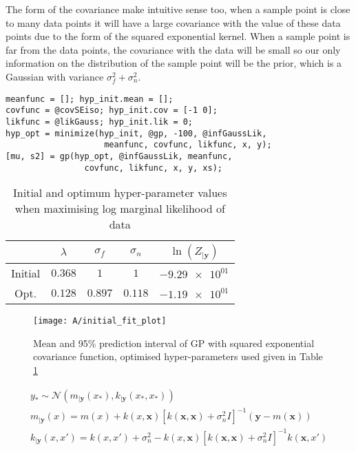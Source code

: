 \documentclass[11pt, twocolumn]{article}
\begin{document}
The form of the covariance make intuitive sense too, when a sample point is close to many data points it will have a large covariance with the value of these data points due to the form of the squared exponential kernel. When a sample point is far from the data points, the covariance with the data will be small so our only information on the distribution of the sample point will be the prior, which is a Gaussian with variance $\sigma_f^2 + \sigma_n^2$.

\begin{figure*}[h]
\begin{lstlisting}[caption=Code to train hyper-parameters and generate the predictive distribution of a GP with squared exponential covariance, captionpos=b, basicstyle=\small, frame=tlrb]
meanfunc = []; hyp_init.mean = [];
covfunc = @covSEiso; hyp_init.cov = [-1 0];
likfunc = @likGauss; hyp_init.lik = 0;
hyp_opt = minimize(hyp_init, @gp, -100, @infGaussLik, 
                    meanfunc, covfunc, likfunc, x, y);
[mu, s2] = gp(hyp_opt, @infGaussLik, meanfunc, 
                covfunc, likfunc, x, y, xs);
\end{lstlisting}
\end{figure*}
\label{lst:A}

\begin{table}[h]
    \centering
    \small
    \begin{tabular}{|c|c|c|c|c|}
        \hline
         & $\lambda$ & $\sigma_f$ & $\sigma_n$ & $\ln(Z_{|\textbf{y}})$ \\
        \hline
        Initial & $0.368$ & $1$ & $1$ & $\num{-9.29e+01}$ \\ 
        Opt. & $0.128$ & $0.897$ & $0.118$ & $\num{-1.19e+01}$ \\ 
        \hline
    \end{tabular}
    \caption{Initial and optimum hyper-parameter values when maximising log marginal likelihood of data}
    \label{table:A_hyper_parameters}
\end{table}

\begin{figure}[h]
    \centering
    \texttt{[image: A/initial\_fit\_plot]}
    \caption{Mean and 95\% prediction interval of GP with squared exponential covariance function, optimised hyper-parameters used given in Table \ref{table:A_hyper_parameters}}
    \label{fig:A}
\end{figure}

\begin{equation*}
    \begin{gathered}
        y_* \sim \mathcal{N}(m_{|\textbf{y}}(x_*), k_{|\textbf{y}}(x_*, x_*)) \\
        m_{|\textbf{y}}(x) = m(x) + k(x, \textbf{x})[k(\textbf{x}, \textbf{x}) + \sigma_n^2 I]^{-1} (\textbf{y} - m(\textbf{x})) \\
        k_{|\textbf{y}}(x, x') = k(x, x') + \sigma_n^2 - k(x, \textbf{x})[k(\textbf{x}, \textbf{x}) + \sigma_n^2 I]^{-1} k(\textbf{x}, x')
    \end{gathered}
    \label{equation:A_predictive_distribution}
\end{equation*}
\end{document}
